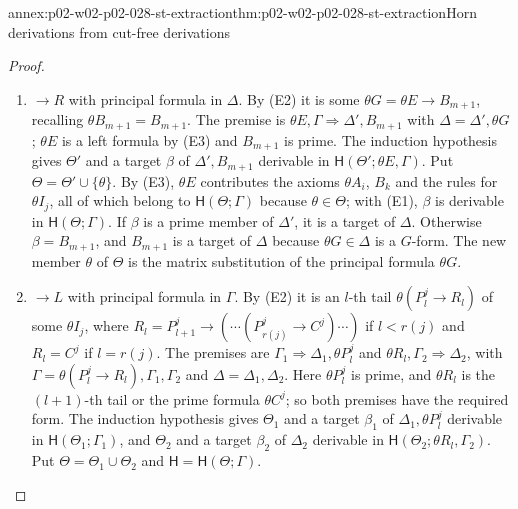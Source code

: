 \begin{annexitem}{annex:p02-w02-p02-028-st-extraction}{thm:p02-w02-p02-028-st-extraction}{Horn derivations from cut-free derivations}
\begin{proof}
\begin{enumerate}
        and no left formula beginning with \(\exists\); these cases do not
        arise.
  \item \emph{\(\to R\)} with principal formula in \(\Delta\).  By (E2) it is
        some \(\theta G=\theta E\to B_{m+1}\), recalling
        \(\theta B_{m+1}=B_{m+1}\).  The premise is
        \(\theta E,\Gamma\Rightarrow\Delta',B_{m+1}\) with
        \(\Delta=\Delta',\theta G\); \(\theta E\) is a left formula by (E3)
        and \(B_{m+1}\) is prime.  The induction hypothesis gives
        \(\Theta'\) and a target \(\beta\) of \(\Delta',B_{m+1}\) derivable in
        \(\mathsf H(\Theta';\theta E,\Gamma)\).  Put
        \(\Theta=\Theta'\cup\{\theta\}\).  By (E3), \(\theta E\) contributes
        the axioms \(\theta A_i\), \(B_k\) and the rules for \(\theta I_j\),
        all of which belong to \(\mathsf H(\Theta;\Gamma)\) because
        \(\theta\in\Theta\); with (E1), \(\beta\) is derivable in
        \(\mathsf H(\Theta;\Gamma)\).  If \(\beta\) is a prime member of
        \(\Delta'\), it is a target of \(\Delta\).  Otherwise
        \(\beta=B_{m+1}\), and \(B_{m+1}\) is a target of \(\Delta\) because
        \(\theta G\in\Delta\) is a \(G\)-form.  The new member \(\theta\) of
        \(\Theta\) is the matrix substitution of the principal formula
        \(\theta G\).
  \item \emph{\(\to L\)} with principal formula in \(\Gamma\).  By (E2) it is
        an \(l\)-th tail \(\theta(P^j_l\to R_l)\) of some \(\theta I_j\),
        where \(R_l=P^j_{l+1}\to(\cdots(P^j_{r(j)}\to C^j)\cdots)\) if
        \(l<r(j)\) and \(R_l=C^j\) if \(l=r(j)\).  The premises are
        \(\Gamma_1\Rightarrow\Delta_1,\theta P^j_l\) and
        \(\theta R_l,\Gamma_2\Rightarrow\Delta_2\), with
        \(\Gamma=\theta(P^j_l\to R_l),\Gamma_1,\Gamma_2\) and
        \(\Delta=\Delta_1,\Delta_2\).  Here \(\theta P^j_l\) is prime, and
        \(\theta R_l\) is the \((l+1)\)-th tail or the prime formula
        \(\theta C^j\); so both premises have the required form.  The
        induction hypothesis gives \(\Theta_1\) and a target \(\beta_1\) of
        \(\Delta_1,\theta P^j_l\) derivable in
        \(\mathsf H(\Theta_1;\Gamma_1)\), and \(\Theta_2\) and a target
        \(\beta_2\) of \(\Delta_2\) derivable in
        \(\mathsf H(\Theta_2;\theta R_l,\Gamma_2)\).  Put
        \(\Theta=\Theta_1\cup\Theta_2\) and \(\mathsf H=\mathsf H(\Theta;\Gamma)\).


\end{enumerate}
\end{proof}
\end{annexitem}
